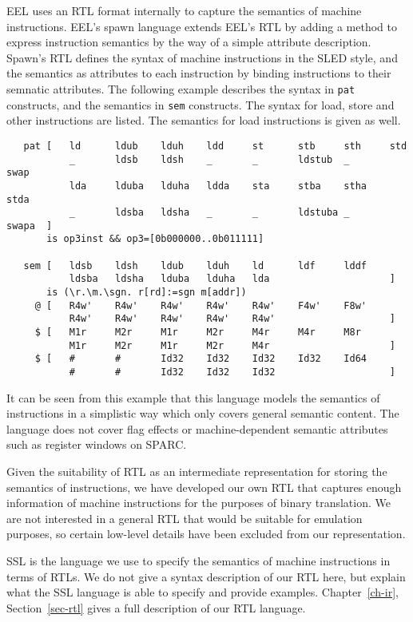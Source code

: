 EEL uses an RTL format internally to capture the semantics
of machine instructions.
EEL's spawn language extends EEL's RTL by adding a method to 
express instruction semantics by the way of a simple attribute
description.  Spawn's RTL defines the syntax of machine instructions
in the SLED style, and the semantics as attributes to each 
instruction by binding instructions to their semnatic attributes.
The following example describes the syntax in \texttt{pat} 
constructs, and the semantics in \texttt{sem} constructs.  
The syntax for load, store and other instructions are listed.
The semantics for load instructions is given as well.
{\small
\begin{verbatim}    
   pat [   ld      ldub    lduh    ldd     st      stb     sth     std    
           _       ldsb    ldsh    _       _       ldstub  _       swap    
           lda     lduba   lduha   ldda    sta     stba    stha    stda    
           _       ldsba   ldsha   _       _       ldstuba _       swapa  ]    
       is op3inst && op3=[0b000000..0b011111]    
  
   sem [   ldsb    ldsh    ldub    lduh    ld      ldf     lddf    
           ldsba   ldsha   lduba   lduha   lda                     ]    
       is (\r.\m.\sgn. r[rd]:=sgn m[addr])    
     @ [   R4w'    R4w'    R4w'    R4w'    R4w'    F4w'    F8w'    
           R4w'    R4w'    R4w'    R4w'    R4w'                    ]    
     $ [   M1r     M2r     M1r     M2r     M4r     M4r     M8r    
           M1r     M2r     M1r     M2r     M4r                     ]    
     $ [   #       #       Id32    Id32    Id32    Id32    Id64    
           #       #       Id32    Id32    Id32                    ]    
\end{verbatim}    
}
It can be seen from this example that this language models the
semantics of instructions in a simplistic way which only covers
general semantic content.  The language does not cover flag
effects or machine-dependent semantic attributes such as register
windows on SPARC.  

Given the suitability of RTL as an intermediate representation
for storing the semantics of instructions, we have developed
our own RTL that captures enough information of machine instructions
for the purposes of binary translation.  We are not interested
in a general RTL that would be suitable for emulation purposes,
so certain low-level details have been excluded from our
representation.  

SSL is the language we use to specify the semantics of machine
instructions in terms of RTLs.  We do not give a syntax description 
of our RTL here, but explain what the SSL language is able to 
specify and provide examples.  Chapter~\ref{ch-ir}, Section~\ref{sec-rtl}
gives a full description of our RTL language. 



